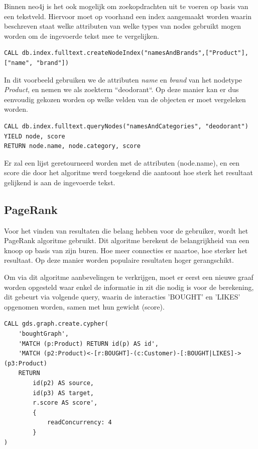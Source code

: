 Binnen neo4j is het ook mogelijk om zoekopdrachten uit te voeren op basis van een tekstveld. Hiervoor moet op voorhand een index aangemaakt worden waarin beschreven staat welke attributen van welke types van nodes gebruikt mogen worden om de ingevoerde tekst mee te vergelijken.

\begin{lstlisting}[caption={Een index creëren binnen Neo4j om zoekopdrachten op basis van tekst uit te voeren}]
CALL db.index.fulltext.createNodeIndex("namesAndBrands",["Product"],["name", "brand"])
\end{lstlisting}

In dit voorbeeld gebruiken we de attributen \textit{name} en \textit{brand} van het nodetype \textit{Product}, en nemen we als zoekterm ``deodorant``.  Op deze manier kan er dus eenvoudig gekozen worden op welke velden van de objecten er moet vergeleken worden.



\begin{lstlisting}[caption={Een zoekopdracht uitvoeren op basis van tekst}]
CALL db.index.fulltext.queryNodes("namesAndCategories", "deodorant") YIELD node, score
RETURN node.name, node.category, score
\end{lstlisting}

Er zal een lijst geretourneerd worden met de attributen (node.name), en een score die door het algoritme werd toegekend die aantoont hoe sterk het resultaat gelijkend is aan de ingevoerde tekst.

\subsection{PageRank}
\label{subsec:PageRank}

Voor het vinden van resultaten die belang hebben voor de gebruiker, wordt het PageRank algoritme gebruikt. Dit algoritme berekent de belangrijkheid van een knoop op basis van zijn buren. Hoe meer connecties er naartoe, hoe sterker het resultaat. Op deze manier worden populaire resultaten hoger gerangschikt.

Om via dit algoritme aanbevelingen te verkrijgen, moet er eerst een nieuwe graaf worden opgesteld waar enkel de informatie in zit die nodig is voor de berekening, dit gebeurt via volgende query, waarin de interacties 'BOUGHT' en 'LIKES' opgenomen worden, samen met hun gewicht (score).

\begin{lstlisting}[caption={Een genoemde graaf creëren om graafalgoritmen op uit te voeren}]
CALL gds.graph.create.cypher(
	'boughtGraph',
	'MATCH (p:Product) RETURN id(p) AS id',
	'MATCH (p2:Product)<-[r:BOUGHT]-(c:Customer)-[:BOUGHT|LIKES]->(p3:Product)
	RETURN
		id(p2) AS source,
		id(p3) AS target,
		r.score AS score',
		{
			readConcurrency: 4
		}
)
\end{lstlisting}

